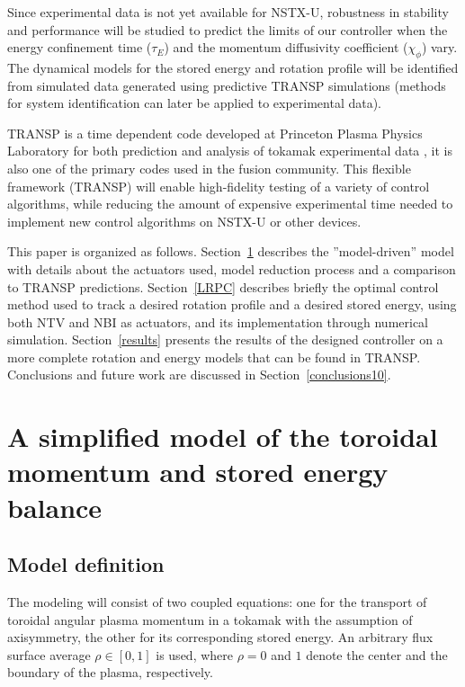 \documentclass[12pt,lot, lof]{puthesis}
\begin{document}
Since experimental data is not yet available for NSTX-U, robustness in stability and performance will be studied to predict the limits of our controller when the energy confinement time ($\tau_E$) and the momentum diffusivity coefficient ($\chi_{\phi}$) vary.
The dynamical models for the stored energy and rotation profile will be identified from simulated data generated using predictive TRANSP simulations (methods for system identification can later be applied to experimental data). 

TRANSP is a time dependent code developed at Princeton Plasma Physics Laboratory for both prediction and analysis of tokamak experimental data \cite{Budny94, Goldston81}, it is also one of the primary codes used in the fusion community.
This flexible framework (TRANSP) will enable high-fidelity testing of a variety of control algorithms, while reducing the amount of expensive experimental time needed to implement new control algorithms on NSTX-U or other devices.

This paper is organized as follows.  Section~\ref{MHW} describes the ''model-driven'' model with details about the actuators used, model reduction process and a comparison to TRANSP predictions. Section~\ref{LRPC} describes briefly the optimal control method used to track a desired rotation profile and a desired stored energy, using both NTV and NBI as actuators, and its implementation through numerical simulation. Section~\ref{results} presents the results of the designed controller on a more complete rotation and energy models that can be found in TRANSP. Conclusions and future work are discussed in Section~\ref{conclusions10}.

 \section{A simplified model of  the toroidal momentum and stored energy balance }
 \label{MHW}
 
 \subsection{Model definition}
The modeling will consist of two coupled equations: one for the transport of toroidal angular plasma momentum in a tokamak with the assumption of axisymmetry, the other for its corresponding stored energy.
An arbitrary flux surface average $\rho \in [0,1]$ is used, where $\rho = 0$ and $1$ denote the center and the boundary of the plasma, respectively.  
 
\end{document}
